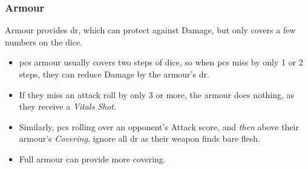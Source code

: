 \subsubsection*{Armour}

Armour provides \gls{dr}, which can protect against Damage, but only covers a few numbers on the dice.

\begin{itemize}
  \item
  \Glspl{pc} armour usually covers two steps of dice, so when \glspl{pc} miss by only 1 or 2 steps, they can reduce Damage by the armour's \gls{dr}.
  \item
  If they miss an attack roll by only 3 or more, the armour does nothing, as they receive a \textit{Vitals Shot}.
  \item
  Similarly, \glspl{pc} rolling over an opponent's Attack score, and \emph{then} above their armour's \textit{Covering}, ignore all \gls{dr} as their weapon finds bare flesh.
  \item
  Full armour can provide more covering.
\end{itemize}
